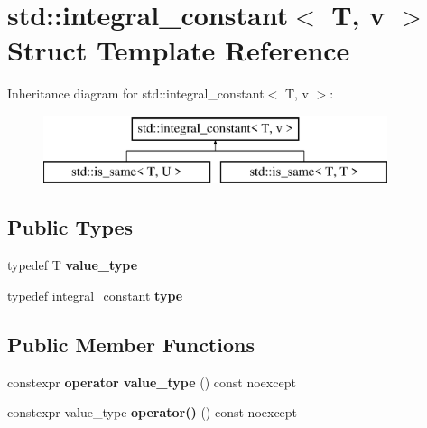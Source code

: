 \hypertarget{structstd_1_1integral__constant}{}\section{std\+:\+:integral\+\_\+constant$<$ T, v $>$ Struct Template Reference}
\label{structstd_1_1integral__constant}
Inheritance diagram for std\+:\+:integral\+\_\+constant$<$ T, v $>$\+:\begin{figure}[H]
\begin{center}
\leavevmode
\includegraphics[height=2.000000cm]{da/dcf/structstd_1_1integral__constant}
\end{center}
\end{figure}
\subsection*{Public Types}
\begin{DoxyCompactItemize}
\item 
\hypertarget{structstd_1_1integral__constant_a577f947f94f81e5992b37a1748a51d97}{}\label{structstd_1_1integral__constant_a577f947f94f81e5992b37a1748a51d97} 
typedef T {\bfseries value\+\_\+type}
\item 
\hypertarget{structstd_1_1integral__constant_ab0ee496d528433edf4b782e6fcd47d1e}{}\label{structstd_1_1integral__constant_ab0ee496d528433edf4b782e6fcd47d1e} 
typedef \hyperlink{structstd_1_1integral__constant}{integral\+\_\+constant} {\bfseries type}
\end{DoxyCompactItemize}
\subsection*{Public Member Functions}
\begin{DoxyCompactItemize}
\item 
\hypertarget{structstd_1_1integral__constant_a63cf3115ee14c1bf3e87730d41b3fea3}{}\label{structstd_1_1integral__constant_a63cf3115ee14c1bf3e87730d41b3fea3} 
constexpr {\bfseries operator value\+\_\+type} () const noexcept
\item 
\hypertarget{structstd_1_1integral__constant_a3dc39a4cfefa5334de46c5d2f93b9910}{}\label{structstd_1_1integral__constant_a3dc39a4cfefa5334de46c5d2f93b9910} 
constexpr value\+\_\+type {\bfseries operator()} () const noexcept
\end{DoxyCompactItemize}
